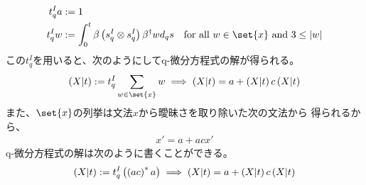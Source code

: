 {\begin{todo}[文法の曖昧さと積分]
\begin{equation*}
\begin{split}
			t_q^Ia &:= 1 \\
			t_q^Iw &:= \int_0^t \beta\lr{s_q^I\otimes s_q^I}\beta^\dag w d_qs
			\quad\text{for all } w\in\set{x} \text{ and } 3\le |w|
		\end{split}\end{equation*}
		この$t_q^I$を用いると、次のようにしてq-微分方程式の解が得られる。
		\begin{equation*}\begin{split}
			\lr{X|t} := t_q^I\sum_{w\in\set{x}} w
			\implies \lr{X|t} = a + \lr{X|t}c\lr{X|t}
		\end{split}\end{equation*}
		また、$\set{x}$の列挙は文法$x$から曖昧さを取り除いた次の文法から
		得られるから、
		\begin{equation*}\begin{split}
			x' = a + acx'
		\end{split}\end{equation*}
		q-微分方程式の解は次のように書くことができる。
		\begin{equation*}\begin{split}
			\left({X|t}\right) := t_q^I\left({\left({ac}\right)^*a}\right)
			\implies \left({X|t}\right) = a + \left({X|t}\right)c\left({X|t}\right)
		\end{split}\end{equation*}
	\end{todo} %

}
